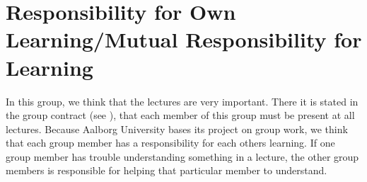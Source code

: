 \section{Responsibility for Own Learning/Mutual Responsibility for Learning}
In this group, we think that the lectures are very important. There it is stated in the group contract (see ), that each member of this group must be present at all lectures. Because Aalborg University bases its project on group work, we think that each group member has a responsibility for each others learning. If one group member has trouble understanding something in a lecture, the other group members is responsible for helping that particular member to understand. 